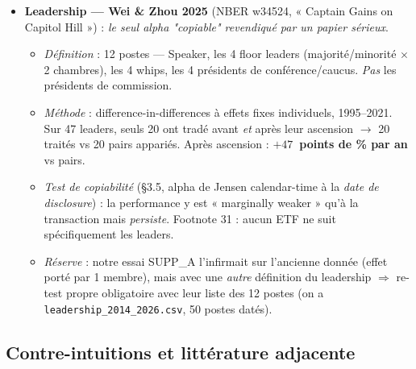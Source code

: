 \documentclass[11pt,a4paper]{article}
\newcommand{\code}[1]{\texttt{\small #1}}
\begin{document}
\begin{itemize}
\begin{itemize}
    $\alpha_{4F} = +92$~bps/mois ($t=3{,}01$, $\approx +11\%$/an), porté à $+130$~bps ($t=2{,}78$,
    $\approx +15{,}6\%$/an) en n'écoutant que les intéressés. \emph{Signal distinct des PTR.}
  \end{itemize}
  \item \textbf{Leadership --- Wei \& Zhou 2025} (NBER w34524, « Captain Gains on Capitol Hill ») : \emph{le
  seul alpha "copiable" revendiqué par un papier sérieux}.
  \begin{itemize}
    \item \emph{Définition} : 12 postes --- Speaker, les 4 floor leaders (majorité/minorité $\times$ 2
    chambres), les 4 whips, les 4 présidents de conférence/caucus. \emph{Pas} les présidents de commission.
    \item \emph{Méthode} : difference-in-differences à effets fixes individuels, 1995--2021. Sur 47 leaders,
    seuls 20 ont tradé avant \emph{et} après leur ascension $\to$ 20 traités vs 20 pairs appariés.
    Après ascension : \textbf{$+47$~points de \% par an} vs pairs.
    \item \emph{Test de copiabilité} (§3.5, alpha de Jensen calendar-time à la \emph{date de disclosure}) : la
    performance y est « marginally weaker » qu'à la transaction mais \emph{persiste}. Footnote 31 : aucun ETF
    ne suit spécifiquement les leaders.
    \item \emph{Réserve} : notre essai SUPP\_A l'infirmait sur l'ancienne donnée (effet porté par 1 membre),
    mais avec une \emph{autre} définition du leadership $\Rightarrow$ re-test propre obligatoire avec leur
    liste des 12 postes (on a \code{leadership\_2014\_2026.csv}, 50 postes datés).
  \end{itemize}
\end{itemize}

\subsection{Contre-intuitions et littérature adjacente}
\end{document}
